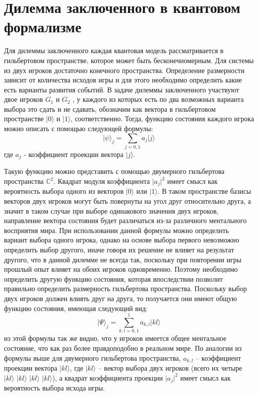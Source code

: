 \section{Дилемма заключенного в квантовом формализме}

Для дилеммы заключенного каждая квантовая модель рассматривается в гильбертовом пространстве, которое
может быть бесконечномерным.
Для системы из двух игроков достаточно конечного пространства.
Определение размерности зависит от количества исходов игры и для этого необходимо определить какие
есть варианты развития событий.
В задаче дилеммы заключенного участвуют двое игроков $G_{1}$ и $G_{2}$ , у каждого из которых есть по два возможных
варианта выбора это сдать и не сдавать, обозначим как вектора в гильбертовом пространстве
$\vert 0 \rangle$ и $\vert 1 \rangle$, соответственно.
Тогда, функцию состояния каждого игрока можно описать с помощью следующей формулы:
\begin{equation}
    \vert \psi \rangle_{j} = \sum_{j=0,1} a_{j} \vert j \rangle
\end{equation}
где $a_{j}$ - коэффициент проекции вектора $\vert j \rangle$.

Такую функцию можно представить с помощью двумерного гильбертова пространства $\mathbb{C}^{2}$.
Квадрат модуля коэффициента $\vert a_{j} \vert^{2}$ имеет смысл как вероятность выбора одного из
векторов $\vert 0 \rangle$ или $\vert 1 \rangle$.
В таком пространстве базисы векторов двух игроков могут быть повернуты на угол друг относительно друга,
а значит в таком случае при выборе одинакового значения двух игроков, направление вектора состояния
будет различаться из-за различного ментального восприятия мира.
При использовании данной формулы можно определить вариант выбора одного игрока, однако на основе
выбора первого невозможно определить выбор другого, иначе говоря их решение не влияет на результат
другого, что в данной дилемме не всегда так, поскольку при повторении игры прошлый опыт влияет на
обоих игроков одновременно.
Поэтому необходимо определить другую функцию состояния, которая впоследствии позволит правильно
определить размерность гильбертова пространства.
Поскольку выбор двух игроков должен влиять друг на друга, то получается они имеют общую функцию
состояния, имеющая следующий вид:
\begin{equation}
    \vert \Psi \rangle_{j} = \sum_{k,l=0,1}^{1} a_{k,l} \vert kl \rangle
\end{equation}
из этой формулы так же видно, что у игроков имеется общее ментальное состояние, что как раз более
правдоподобно в реальном мире.
По аналогии из формулы выше для двумерного гильбертова пространства, $a_{k,l}$ – коэффициент
проекции вектора $\vert kl \rangle$, где $\vert kl \rangle$ – вектор выбора двух игроков
(всего их четыре $\vert kl \rangle$ $\vert kl \rangle$ $\vert kl \rangle$ $\vert kl \rangle$),
а квадрат коэффициента проекции $\vert a_{j} \vert^{2}$ имеет смысл как вероятность выбора исхода игры.

